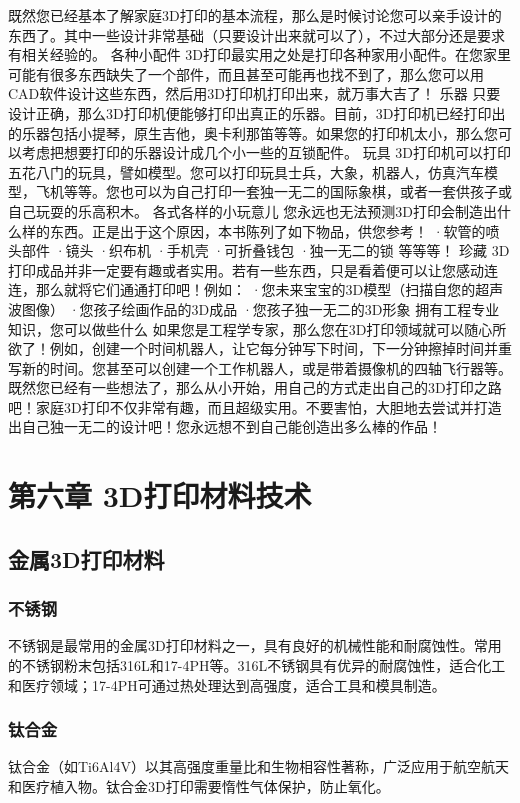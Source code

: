 \documentclass[12pt,UTF8]{ctexbook}
\begin{document}
既然您已经基本了解家庭3D打印的基本流程，那么是时候讨论您可以亲手设计的东西了。其中一些设计非常基础（只要设计出来就可以了），不过大部分还是要求有相关经验的。
各种小配件
3D打印最实用之处是打印各种家用小配件。在您家里可能有很多东西缺失了一个部件，而且甚至可能再也找不到了，那么您可以用CAD软件设计这些东西，然后用3D打印机打印出来，就万事大吉了！
乐器
只要设计正确，那么3D打印机便能够打印出真正的乐器。目前，3D打印机已经打印出的乐器包括小提琴，原生吉他，奥卡利那笛等等。如果您的打印机太小，那么您可以考虑把想要打印的乐器设计成几个小一些的互锁配件。
玩具
3D打印机可以打印五花八门的玩具，譬如模型。您可以打印玩具士兵，大象，机器人，仿真汽车模型，飞机等等。您也可以为自己打印一套独一无二的国际象棋，或者一套供孩子或自己玩耍的乐高积木。
各式各样的小玩意儿
您永远也无法预测3D打印会制造出什么样的东西。正是出于这个原因，本书陈列了如下物品，供您参考！
·软管的喷头部件
·镜头
·织布机
·手机壳
·可折叠钱包
·独一无二的锁
等等等！
珍藏
3D打印成品并非一定要有趣或者实用。若有一些东西，只是看着便可以让您感动连连，那么就将它们通通打印吧！例如：
·您未来宝宝的3D模型（扫描自您的超声波图像）
·您孩子绘画作品的3D成品
·您孩子独一无二的3D形象
拥有工程专业知识，您可以做些什么
如果您是工程学专家，那么您在3D打印领域就可以随心所欲了！例如，创建一个时间机器人，让它每分钟写下时间，下一分钟擦掉时间并重写新的时间。您甚至可以创建一个工作机器人，或是带着摄像机的四轴飞行器等。
既然您已经有一些想法了，那么从小开始，用自己的方式走出自己的3D打印之路吧！家庭3D打印不仅非常有趣，而且超级实用。不要害怕，大胆地去尝试并打造出自己独一无二的设计吧！您永远想不到自己能创造出多么棒的作品！



\chapter{第六章 3D打印材料技术}

\section{金属3D打印材料}

\subsection{不锈钢}
不锈钢是最常用的金属3D打印材料之一，具有良好的机械性能和耐腐蚀性。常用的不锈钢粉末包括316L和17-4PH等。316L不锈钢具有优异的耐腐蚀性，适合化工和医疗领域；17-4PH可通过热处理达到高强度，适合工具和模具制造。

\subsection{钛合金}
钛合金（如Ti6Al4V）以其高强度重量比和生物相容性著称，广泛应用于航空航天和医疗植入物。钛合金3D打印需要惰性气体保护，防止氧化。
\end{document}
